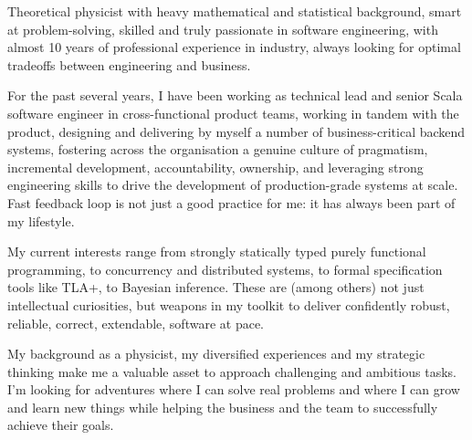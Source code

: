 
\begin{cvparagraph}
Theoretical physicist with heavy mathematical and statistical 
background, smart at problem-solving, skilled and truly passionate in software engineering, with almost 10 years of professional experience in industry, always looking for optimal tradeoffs between engineering and business.

  For the past several years, I have been working as technical lead and senior Scala software engineer in cross-functional product teams, working in tandem with the product, designing and delivering by myself a number of business-critical backend systems, fostering  across the organisation a genuine culture of pragmatism, incremental development, accountability, ownership, and leveraging strong engineering skills 
  to drive the development of production-grade systems at scale. Fast feedback loop is not just a good practice for me: it has always been part of my lifestyle.

  My current interests range from strongly statically typed purely functional programming, to concurrency and distributed systems, to formal specification tools like TLA+, to Bayesian inference. These are (among others) not just intellectual curiosities, but weapons in my toolkit to deliver confidently robust, reliable, correct, extendable, software at pace. 

My background as a physicist, my diversified experiences and my strategic thinking make me a valuable asset to approach challenging and ambitious tasks. I'm looking for adventures where I can solve real problems and where I can grow and learn new things while helping the business and the team to successfully achieve their goals. 
\end{cvparagraph}
